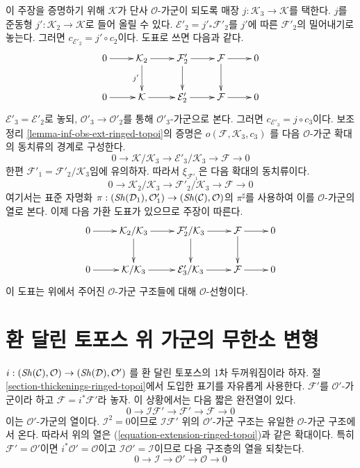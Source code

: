 \begin{remark}
\medskip\noindent
이 주장을 증명하기 위해 $\mathcal{K}$가 단사 $\mathcal{O}$-가군이
되도록 매장 $j : \mathcal{K}_3 \to \mathcal{K}$를 택한다. $j$를 준동형
$j' : \mathcal{K}_2 \to \mathcal{K}$로 들어 올릴 수 있다.
$\mathcal{E}'_2 = j'_*\mathcal{F}'_2$를 $j'$에 따른
$\mathcal{F}'_2$의 밀어내기로 놓는다. 그러면
$c_{\mathcal{E}'_2} = j' \circ c_2$이다. 도표로 쓰면 다음과 같다.
$$
\xymatrix{
0 \ar[r] &
\mathcal{K}_2 \ar[r] \ar[d]_{j'} &
\mathcal{F}'_2 \ar[r] \ar[d] &
\mathcal{F} \ar[r] \ar[d] & 0 \\
0 \ar[r] &
\mathcal{K} \ar[r] &
\mathcal{E}'_2 \ar[r] &
\mathcal{F} \ar[r] & 0
}
$$
$\mathcal{E}'_3 = \mathcal{E}'_2$로 놓되,
$\mathcal{O}'_3 \to \mathcal{O}'_2$를 통해 $\mathcal{O}'_3$-가군으로
본다. 그러면 $c_{\mathcal{E}'_3} = j \circ c_3$이다. 보조정리
\ref{lemma-inf-obs-ext-ringed-topoi}의 증명은
$o(\mathcal{F}, \mathcal{K}_3, c_3)$
를 다음 $\mathcal{O}$-가군 확대의 동치류의 경계로 구성한다.
$$
0 \to
\mathcal{K}/\mathcal{K}_3 \to
\mathcal{E}'_3/\mathcal{K}_3 \to
\mathcal{F} \to 0
$$
한편 $\mathcal{F}'_1 = \mathcal{F}'_2/\mathcal{K}_3$임에 유의하자.
따라서 $\xi_{\mathcal{F}'_1}$은 다음 확대의 동치류이다.
$$
0 \to \mathcal{K}_2/\mathcal{K}_3 \to \mathcal{F}'_2/\mathcal{K}_3
\to \mathcal{F} \to 0
$$
여기서는 표준 자명화
$\pi : (\mathop{\mathit{Sh}}\nolimits(\mathcal{D}_1), \mathcal{O}'_1) \to
(\mathop{\mathit{Sh}}\nolimits(\mathcal{C}), \mathcal{O})$의 $\pi^\sharp$를 사용하여 이를
$\mathcal{O}$-가군의 열로 본다. 이제 다음 가환 도표가 있으므로 주장이
따른다.
$$
\xymatrix{
0 \ar[r] &
\mathcal{K}_2/\mathcal{K}_3 \ar[r] \ar[d] &
\mathcal{F}'_2/\mathcal{K}_3 \ar[r] \ar[d] &
\mathcal{F} \ar[r] \ar[d] & 0 \\
0 \ar[r] &
\mathcal{K}/\mathcal{K}_3 \ar[r] &
\mathcal{E}'_3/\mathcal{K}_3 \ar[r] &
\mathcal{F} \ar[r] & 0
}
$$
이 도표는 위에서 주어진 $\mathcal{O}$-가군 구조들에 대해
$\mathcal{O}$-선형이다.
\end{remark}







\section{환 달린 토포스 위 가군의 무한소 변형}
\label{section-deformation-modules-ringed-topoi}

\noindent
$i : (\mathop{\mathit{Sh}}\nolimits(\mathcal{C}), \mathcal{O}) \to (\mathop{\mathit{Sh}}\nolimits(\mathcal{D}), \mathcal{O}')$
를 환 달린 토포스의 1차 두꺼워짐이라 하자. 절
\ref{section-thickenings-ringed-topoi}에서 도입한 표기를 자유롭게
사용한다. $\mathcal{F}'$를 $\mathcal{O}'$-가군이라 하고
$\mathcal{F} = i^*\mathcal{F}'$라 놓자. 이 상황에서는 다음 짧은
완전열이 있다.
$$
0 \to \mathcal{I}\mathcal{F}' \to \mathcal{F}' \to \mathcal{F} \to 0
$$
이는 $\mathcal{O}'$-가군의 열이다. $\mathcal{I}^2 = 0$이므로
$\mathcal{I}\mathcal{F}'$ 위의 $\mathcal{O}'$-가군 구조는 유일한
$\mathcal{O}$-가군 구조에서 온다. 따라서 위의 열은
(\ref{equation-extension-ringed-topoi})과 같은 확대이다. 특히
$\mathcal{F}' = \mathcal{O}'$이면 $i^*\mathcal{O}' = \mathcal{O}$이고
$\mathcal{I}\mathcal{O}' = \mathcal{I}$이므로 다음 구조층의 열을 되찾는다.
$$
0 \to \mathcal{I} \to \mathcal{O}' \to \mathcal{O} \to 0
$$

